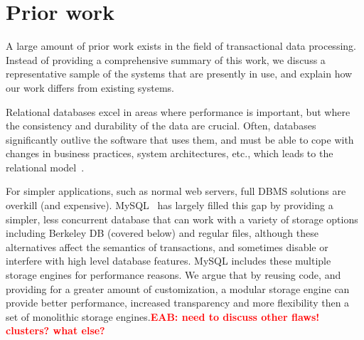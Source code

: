 \documentclass[letterpaper,twocolumn,english]{article}
\newcommand{\yad}{Lemon\xspace}
\newcommand{\eab}[1]{\textcolor{red}{\bf EAB: #1}}
\begin{document}
\section{Prior work}

A large amount of prior work exists in the field of transactional data
processing.  Instead of providing a comprehensive summary of this
work, we discuss a representative sample of the systems that are
presently in use, and explain how our work differs from existing
systems.




Relational databases excel in areas
where performance is important, but where the consistency and
durability of the data are crucial.  Often, databases significantly
outlive the software that uses them, and must be able to cope with
changes in business practices, system architectures,
etc., which leads to the relational model~\cite{relational}.

For simpler applications, such as normal web servers, full DBMS
solutions are overkill (and expensive).  MySQL~\cite{mysql} has
largely filled this gap by providing a simpler, less concurrent
database that can work with a variety of storage options including
Berkeley DB (covered below) and regular files, although these
alternatives affect the semantics of transactions, and sometimes 
disable or interfere with high level database features.  MySQL 
includes these multiple storage engines for performance reasons.  
We argue that by reusing code, and providing for a greater amount 
of customization, a modular storage engine can provide better 
performance, increased transparency and more flexibility then a 
set of monolithic storage engines.\eab{need to discuss other flaws! clusters? what else?}

\end{document}
